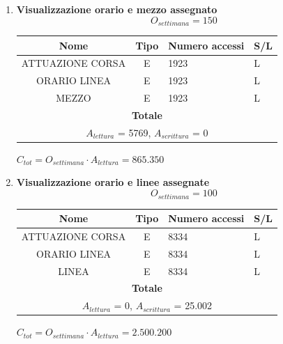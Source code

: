 \documentclass[12pt,a4paper]{report}
\begin{document}
\begin{enumerate}[label=\textbf{\arabic*)}]
    \item \textbf{Visualizzazione orario e mezzo assegnato} \\
    \[ {O_{settimana} = 150} \]
    \begin{table}[H]
    \centering
    \begin{tabular}{|c|c|l|l|}
    \hline
    \textbf{Nome} & \textbf{Tipo} & \textbf{Numero accessi} & \textbf{S/L} \\
    \hline
    ATTUAZIONE CORSA & E & 1923 & L \\ 
    \hline
    ORARIO LINEA & E & 1923 & L \\ 
    \hline
    MEZZO & E & 1923 & L \\
    \hline
    \multicolumn{4}{c}{\textbf{Totale}} \\    
    \multicolumn{4}{c}{${A_{lettura}}$ = 5769, ${A_{scrittura}}$ = 0} \\
    \hline
    \end{tabular}
    \end{table}
    \begin{center}
    ${C_{tot} = {O_{settimana}}\cdot {A_{lettura}} = 865.350}$
    \end{center}

    \item \textbf{Visualizzazione orario e linee assegnate} \\
    \[ {O_{settimana} = 100} \]
    \begin{table}[H]
    \centering
    \begin{tabular}{|c|c|l|l|}
    \hline
    \textbf{Nome} & \textbf{Tipo} & \textbf{Numero accessi} & \textbf{S/L} \\
    \hline
    ATTUAZIONE CORSA & E & 8334 & L \\ 
    \hline
    ORARIO LINEA & E & 8334 & L \\
    \hline
    LINEA & E & 8334 & L \\
    \hline
    \multicolumn{4}{c}{\textbf{Totale}} \\    
    \multicolumn{4}{c}{${A_{lettura}}$ = 0, ${A_{scrittura}}$ = 25.002} \\
    \hline
    \end{tabular}
    \end{table}
    \begin{center}
    ${C_{tot} = {O_{settimana}}\cdot A_{lettura} = 2.500.200}$
    \end{center}


\end{enumerate}
\end{document}
